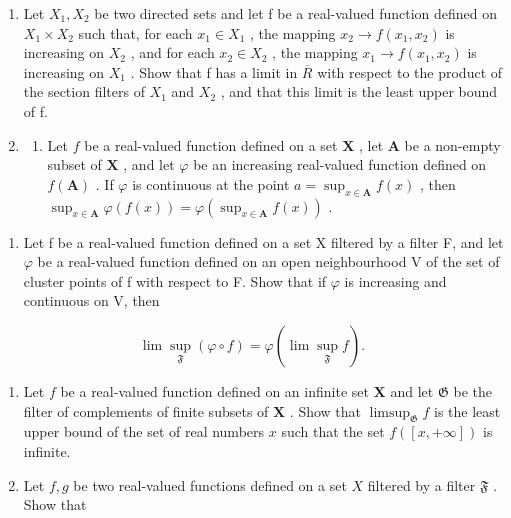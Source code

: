 \BourbakiExerciseGroup

\begin{enumerate}
\def\labelenumi{\arabic{enumi})}
\item
  Let \(X_{1}, X_{2}\) be two directed sets and let f be a real-valued function defined on \(X_{1} \times X_{2}\) such that, for each \(x_{1} \in X_{1}\) , the mapping \(x_{2} \to f(x_{1}, x_{2})\) is increasing on \(X_{2}\) , and for each \(x_{2} \in X_{2}\) , the mapping \(x_{1} \rightarrow f(x_{1}, x_{2})\) is increasing on \(X_{1}\) . Show that f has a limit in \(\overline{R}\) with respect to the product of the section filters of \(X_{1}\) and \(X_{2}\) , and that this limit is the least upper bound of f.
\item
  \begin{enumerate}
  \def\labelenumii{\alph{enumii})}
  \tightlist
  \item
    Let \(f\) be a real-valued function defined on a set \(\mathbf{X}\) , let \(\mathbf{A}\) be a non-empty subset of \(\mathbf{X}\) , and let \(\varphi\) be an increasing real-valued function defined on \(f(\mathbf{A})\) . If \(\varphi\) is continuous at the point \(a = \sup_{x \in \mathbf{A}} f(x)\) , then \(\sup_{x \in \mathbf{A}} \varphi(f(x)) = \varphi(\sup_{x \in \mathbf{A}} f(x))\) .
  \end{enumerate}
\end{enumerate}

\begin{enumerate}
\def\labelenumi{\alph{enumi})}
\setcounter{enumi}{1}
\tightlist
\item
  Let f be a real-valued function defined on a set X filtered by a filter F, and let \(\varphi\) be a real-valued function defined on an open neighbourhood V of the set of cluster points of f with respect to F. Show that if \(\varphi\) is increasing and continuous on V, then
\end{enumerate}

\[
\lim \sup _ {\mathfrak {F}} (\varphi \circ f) = \varphi (\lim \sup _ {\mathfrak {F}} f).
\]

\begin{enumerate}
\def\labelenumi{\arabic{enumi})}
\setcounter{enumi}{2}
\item
  Let \(f\) be a real-valued function defined on an infinite set \(\mathbf{X}\) and let \(\mathfrak{G}\) be the filter of complements of finite subsets of \(\mathbf{X}\) . Show that \(\limsup_{\mathfrak{G}} f\) is the least upper bound of the set of real numbers \(x\) such that the set \(f([x, +\infty])\) is infinite.
\item
  Let \(f, g\) be two real-valued functions defined on a set \(X\) filtered by a filter \(\mathfrak{F}\) . Show that
\end{enumerate}

